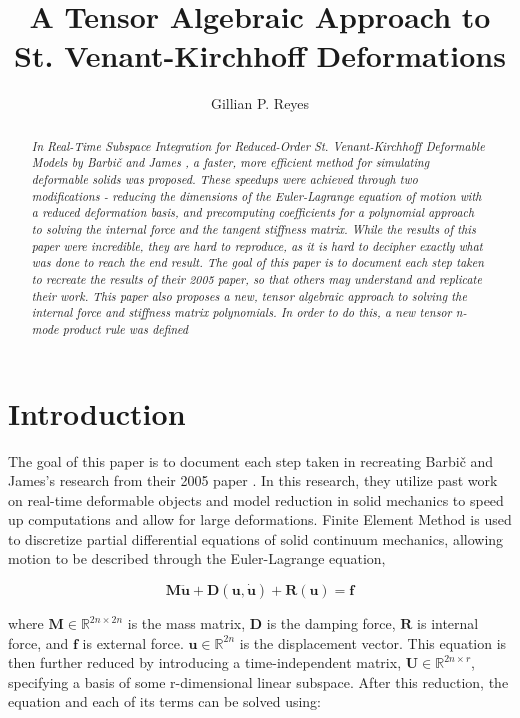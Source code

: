 \documentclass[twocolumn,10pt]{asme2ej}
\title{A Tensor Algebraic Approach to St. Venant-Kirchhoff Deformations}
\author{Gillian P. Reyes
}
\begin{document}
\maketitle

\begin{abstract}
{\it In Real-Time Subspace Integration for Reduced-Order St. Venant-Kirchhoff Deformable Models by Barbič and James \cite{barbic}, a faster, more efficient method for simulating deformable solids was proposed. These speedups were achieved through two modifications - reducing the dimensions of the Euler-Lagrange equation of motion with a reduced deformation basis, and precomputing coefficients for a polynomial approach to solving the internal force and the tangent stiffness matrix. While the results of this paper were incredible, they are hard to reproduce, as it is hard to decipher exactly what was done to reach the end result. The goal of this paper is to document each step taken to recreate the results of their 2005 paper, so that others may understand and replicate their work. This paper also proposes a new, tensor algebraic approach to solving the internal force and stiffness matrix polynomials. In order to do this, a new tensor n-mode product rule was defined
}
\end{abstract}

\section{Introduction}

The goal of this paper is to document each step taken in recreating Barbič and James's research from their 2005
paper \cite{barbic}. In this research, they utilize past work on real-time deformable objects and model reduction in solid mechanics to speed up computations and allow for large deformations. Finite Element Method is used to discretize partial differential equations of solid continuum mechanics, allowing motion to be described through the Euler-Lagrange equation,

\begin{equation}
\bm{M\ddot u} + \bm{D}(\bm{u}, \bm{\dot u}) + \bm{R}(\bm{u}) = \bm{f}
\label{eq_motion}
\end{equation}

where $\bm{M} \in \mathbb{R}^{2n \times 2n }$ is the mass matrix, $\bm{D}$ is the damping force, $\bm{R}$ is internal force, and $\bm{f}$ is external force. $\bm{u} \in \mathbb{R}^{2n}$ is the displacement vector. This equation is then further reduced by introducing a time-independent matrix, $\bm{U} \in \mathbb{R}^{2n \times r}$, specifying a basis of some r-dimensional linear subspace. After this reduction, the equation and each of its terms can be solved using:
\end{document}
